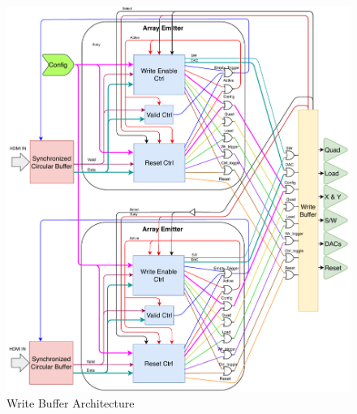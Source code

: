     \begin{figure}
        \centering
        \includegraphics[width=1.0\textwidth]{fig/pdp_wb_arch.pdf}
        \caption{Write Buffer Architecture}
        \label{fig:wb_arch}
    \end{figure}

